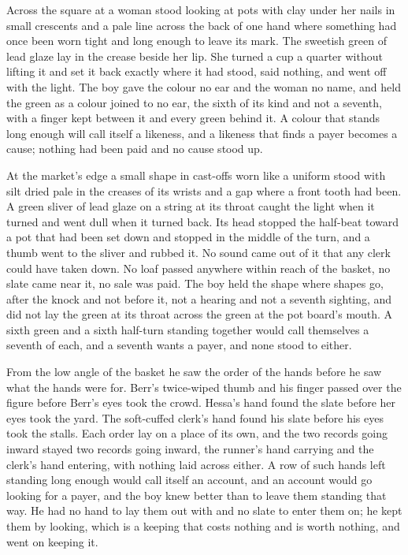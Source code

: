 \scenebreak

Across the square at  a woman stood looking at pots with clay under her nails in small crescents and a pale line across the back of one hand where something had once been worn tight and long enough to leave its mark. The sweetish green of lead glaze lay in the crease beside her lip. She turned a cup a quarter without lifting it and set it back exactly where it had stood, said nothing, and went off with the light. The boy gave the colour no ear and the woman no name, and held the green as a colour joined to no ear, the sixth of its kind and not a seventh, with a finger kept between it and every green behind it. A colour that stands long enough will call itself a likeness, and a likeness that finds a payer becomes a cause; nothing had been paid and no cause stood up.

At the market's edge a small shape in cast-offs worn like a uniform stood with silt dried pale in the creases of its wrists and a gap where a front tooth had been. A green sliver of lead glaze on a string at its throat caught the light when it turned and went dull when it turned back. Its head stopped the half-beat toward a pot that had been set down and stopped in the middle of the turn, and a thumb went to the sliver and rubbed it. No sound came out of it that any clerk could have taken down. No loaf passed anywhere within reach of the basket, no slate came near it, no sale was paid. The boy held the shape where shapes go, after the knock and not before it, not a hearing and not a seventh sighting, and did not lay the green at its throat across the green at the pot board's mouth. A sixth green and a sixth half-turn standing together would call themselves a seventh of each, and a seventh wants a payer, and none stood to either.

From the low angle of the basket he saw the order of the hands before he saw what the hands were for. Berr's twice-wiped thumb and his finger passed over the figure before Berr's eyes took the crowd. Hessa's hand found the slate before her eyes took the yard. The soft-cuffed clerk's hand found his slate before his eyes took the stalls. Each order lay on a place of its own, and the two records going inward stayed two records going inward, the runner's hand carrying and the clerk's hand entering, with nothing laid across either. A row of such hands left standing long enough would call itself an account, and an account would go looking for a payer, and the boy knew better than to leave them standing that way. He had no hand to lay them out with and no slate to enter them on; he kept them by looking, which is a keeping that costs nothing and is worth nothing, and went on keeping it.

